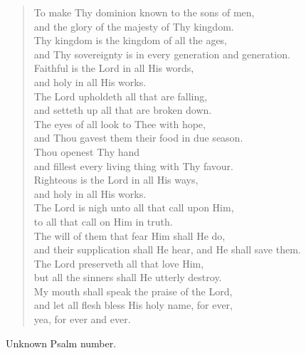 {\begin{verse}
				To make Thy dominion known to the sons of men,\nolinebreak\\
				and the glory of the majesty of Thy kingdom.\nolinebreak\\
				Thy kingdom is the kingdom of all the ages,\nolinebreak\\
				and Thy sovereignty is in every generation and generation.\nolinebreak\\
				Faithful is the Lord in all His words,\nolinebreak\\
				and holy in all His works.\nolinebreak\\
				The Lord upholdeth all that are falling,\nolinebreak\\
				and setteth up all that are broken down.\nolinebreak\\
				The eyes of all look to Thee with hope,\nolinebreak\\
				and Thou gavest them their food in due season.\nolinebreak\\
				Thou openest Thy hand\nolinebreak\\
				and fillest every living thing with Thy favour.\nolinebreak\\
				Righteous is the Lord in all His ways,\nolinebreak\\
				and holy in all His works.\nolinebreak\\
				The Lord is nigh unto all that call upon Him,\nolinebreak\\
				to all that call on Him in truth.\nolinebreak\\
				The will of them that fear Him shall He do,\nolinebreak\\
				and their supplication shall He hear, and He shall save them.\nolinebreak\\
				The Lord preserveth all that love Him,\nolinebreak\\
				but all the sinners shall He utterly destroy.\nolinebreak\\
				My mouth shall speak the praise of the Lord,\nolinebreak\\
				and let all flesh bless His holy name, for ever,\nolinebreak\\
				yea, for ever and ever.
			\end{verse}
	\otherwise
		Unknown Psalm number.
\endswitch}


\newcommand\lilyalleluia{\lilypondfile{./Common/alleluia.ly}}

